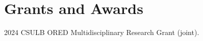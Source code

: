 \documentclass[11pt,letterpaper]{report}
\begin{document}







    \section*{Grants and Awards}

    \begin{tablist}

    \item[2024] CSULB ORED Multidisciplinary Research Grant (joint).

    \end{tablist}


\end{document}
